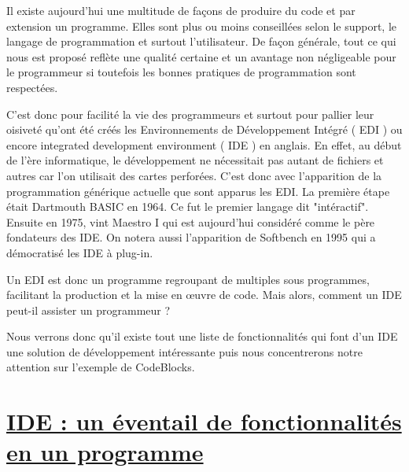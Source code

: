 \documentclass[a4paper, 12pt]{article}
\begin{document}
\begin{doublespace}

	Il existe aujourd'hui une multitude de façons de produire du code et par extension un programme. Elles sont plus ou moins conseillées selon le support, le langage de programmation et surtout l'utilisateur. De façon générale, tout ce qui nous est proposé reflète une qualité certaine et un avantage non négligeable pour le programmeur si toutefois les bonnes pratiques de programmation sont respectées.

	C'est donc pour facilité la vie des programmeurs et surtout pour pallier leur oisiveté qu'ont été créés les Environnements de Développement Intégré ( EDI ) ou encore integrated development environment ( IDE ) en anglais. En effet, au début de l'ère informatique, le développement ne nécessitait pas autant de fichiers et autres car l'on utilisait des cartes perforées. C'est donc avec l'apparition de la programmation générique actuelle que sont apparus les EDI. La première étape était Dartmouth BASIC en 1964. Ce fut le premier langage dit "intéractif". Ensuite en 1975, vint Maestro I qui est aujourd'hui considéré comme le père fondateurs des IDE. On notera aussi l'apparition de Softbench en 1995 qui a démocratisé les IDE à plug-in.

	Un EDI est donc un programme regroupant de multiples sous programmes, facilitant la production et la mise en œuvre de code. Mais alors, comment un IDE peut-il assister un programmeur ?

	Nous verrons donc qu'il existe tout une liste de fonctionnalités qui font d'un IDE une solution de développement intéressante puis nous concentrerons notre attention sur l'exemple de CodeBlocks.
\end{doublespace}

\newpage \section{\underline{IDE : un éventail de fonctionnalités en un programme}}
\end{document}
